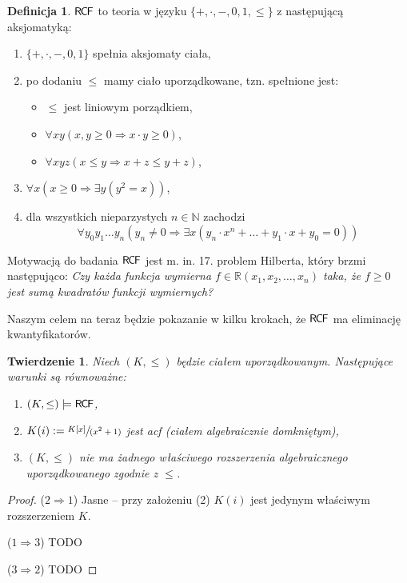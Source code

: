 \documentclass{article}
\newcommand{\N}{\mathbb{N}}
\newcommand{\R}{\mathbb{R}}
\theoremstyle{plain}
\newtheorem{tw}[thm]{Twierdzenie}
\theoremstyle{definition}
\newtheorem{df}[thm]{Definicja}
\theoremstyle{remark}
\newcommand{\RCF}{\mathsf{R \mkern-1.7mu C \mkern-1.4mu F}}
\begin{document}
\begin{df}
	 $ \RCF $ to teoria w języku $ \{ +, \cdot, -, 0, 1, \leq \} $ z następującą aksjomatyką:
	 \begin{enumerate}
		 \item $ \{+, \cdot, -, 0, 1\} $ spełnia aksjomaty ciała,
		 \item po dodaniu $\leq $ mamy ciało uporządkowane, tzn. spełnione jest:
			 \begin{itemize}
				 \item $ \leq $ jest liniowym porządkiem,
				 \item $ \forall x y (x, y \geq 0 \Rightarrow x\cdot y \geq 0) $,
				 \item $\forall x y z (x \leq y \Rightarrow x + z \leq y + z )  $,
			 \end{itemize}

		 \item $ \forall x (x \geq 0 \Rightarrow \exists y ( y^2 = x )) $,
		 \item dla wszystkich nieparzystych $ n \in \N$ zachodzi
			 \[
				 \forall y_0 y_1 \ldots y_n (y_n \neq 0 \Rightarrow \exists x (y_n \cdot x^n + \ldots + y_1 \cdot x + y_0 = 0))
		         \]
	 \end{enumerate}

\end{df}

Motywacją do badania $ \RCF $ jest m. in. 17. problem Hilberta, który brzmi następująco:
\textit{Czy każda funkcja wymierna $ f \in \R(x_1, x_2, \ldots, x_n ) $ taka, że $ f \geq 0 $ jest sumą kwadratów funkcji wymiernych?}

Naszym celem na teraz będzie pokazanie w kilku krokach, że $ \RCF $ ma eliminację kwantyfikatorów.

\begin{tw}
\label{tw:rcf}
	 Niech $ (K, \leq) $ będzie ciałem uporządkowanym.
	 Następujące warunki są równoważne:
	 \begin{enumerate}
		 \item $(K, \leq) \models \RCF $,
		 \item $K(i) := \sfrac{K[x]}{(x^2 + 1)} $ jest acf (ciałem
			 algebraicznie domkniętym),
		 \item $ (K, \leq) $ nie ma żadnego właściwego rozszerzenia
			 algebraicznego uporządkowanego zgodnie z $ \leq $.
	 \end{enumerate}
\end{tw}
\begin{proof}
	($2 \Rightarrow 1$)
	Jasne -- przy założeniu (2) $K(i)$ jest jedynym właściwym rozszerzeniem
	$K$.

	($1 \Rightarrow 3$) TODO

	($3 \Rightarrow 2$) TODO
\end{proof}
\end{document}
